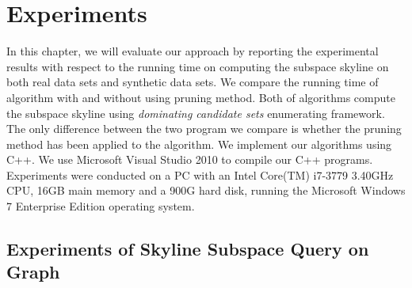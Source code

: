 
%
%

\chapter{Experiments}
\label{ch:exp}

In this chapter, we will evaluate our approach by reporting the experimental results with respect to the running time on computing the subspace skyline on both real data sets and synthetic data sets. We compare the running time of algorithm with and without using pruning method. Both of algorithms compute the subspace skyline using \emph{dominating candidate sets} enumerating framework. The only difference between the two program we compare is whether the pruning method has been applied to the algorithm.
We implement our algorithms using C++. We use Microsoft Visual Studio 2010 to compile our C++ programs. Experiments were conducted on a PC with an Intel Core(TM) i7-3779 3.40GHz CPU, 16GB main memory and a 900G hard disk, running the Microsoft Windows 7 Enterprise Edition operating system.

\section{Experiments of Skyline Subspace Query on Graph}

